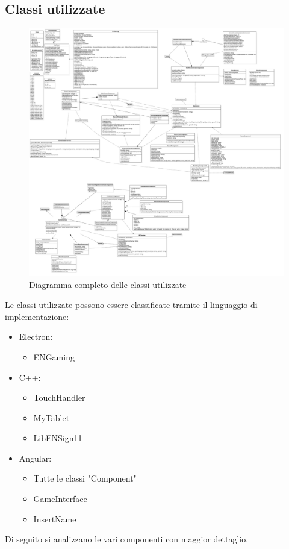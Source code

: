 \subsection{Classi utilizzate}
\begin{figure}[h]
    \centering
    \includegraphics[width=340pt]{ProgettazioneTecnica/ENGaming.png}
    \caption{Diagramma completo delle classi utilizzate}
    \label{fig:diagrammaCompleto}
\end{figure}
Le classi utilizzate possono essere classificate tramite il linguaggio di implementazione:
\begin{itemize}
    \item Electron: \begin{itemize}
        \item ENGaming
    \end{itemize}
    \item C++: \begin{itemize}
        \item TouchHandler
        \item MyTablet
        \item LibENSign11
    \end{itemize}
    \item Angular: \begin{itemize}
        \item Tutte le classi "Component"
        \item GameInterface
        \item InsertName
    \end{itemize}
\end{itemize}
Di seguito si analizzano le vari componenti con maggior dettaglio.
\newpage
